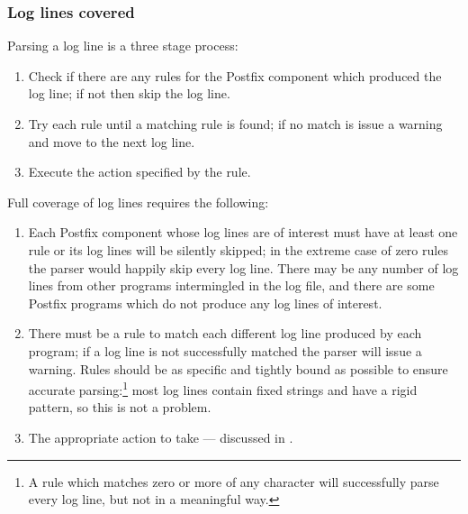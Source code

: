 \subsubsection{Log lines covered}

\label{log-lines-covered}

Parsing a log line is a three stage process:

\begin{enumerate}

    \item Check if there are any rules for the Postfix component which
        produced the log line; if not then skip the log line.

    \item Try each rule until a matching rule is found; if no match is
        issue a warning and move to the next log line.

    \item Execute the action specified by the rule.

\end{enumerate}

Full coverage of log lines requires the following:

\begin{enumerate}

    \item Each Postfix component whose log lines are of interest must have
        at least one rule or its log lines will be silently skipped; in the
        extreme case of zero rules the parser would happily skip every log
        line.  There may be any number of log lines from other programs
        intermingled in the log file, and there are some Postfix programs
        which do not produce any log lines of interest.

    \item There must be a rule to match each different log line produced by
        each program; if a log line is not successfully matched the parser
        will issue a warning.  Rules should be as specific and tightly
        bound as possible to ensure accurate parsing:\footnote{A rule which
        matches zero or more of any character will successfully parse every
        log line, but not in a meaningful way.} most log lines contain
        fixed strings and have a rigid pattern, so this is not a problem.

    \item The appropriate action to take --- discussed in
        .

\end{enumerate}

